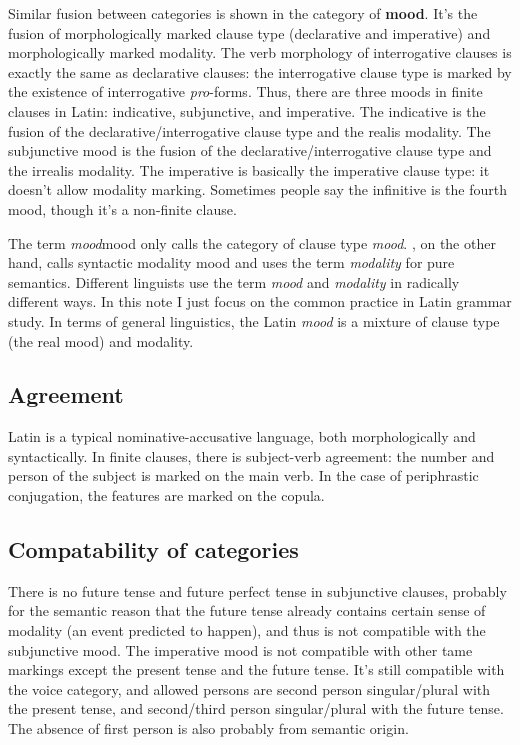 \documentclass[a4paper, oneside]{report}
\newcommand*{\concept}[1]{\textbf{#1}}
\newcommand*{\term}[1]{\emph{#1}}
\begin{document}
Similar fusion between categories is shown in the category of \concept{mood}.
It's the fusion of morphologically marked clause type 
(declarative and imperative)
and morphologically marked modality.
The verb morphology of interrogative clauses is exactly the same as declarative clauses:
the interrogative clause type is marked by the existence of interrogative \term{pro}-forms.
Thus, there are three moods in finite clauses in Latin:
\acl{indicative}, \acl{subjunctive}, and \acl{imperative}.
The \acl{indicative} is the fusion of 
the declarative/interrogative clause type and the realis modality.
The \acl{subjunctive} mood is the fusion of 
the declarative/interrogative clause type and the irrealis modality.
The \acl{imperative} is basically the imperative clause type:
it doesn't allow modality marking.
Sometimes people say the infinitive is the fourth mood,
though it's a non-finite clause.

\begin{infobox}{The term \term{mood}}{mood}
    \citet{dixon2009basic1} only calls the category of clause type \term{mood}.
    \citet{cgel}, on the other hand, 
    calls syntactic modality mood 
    and uses the term \term{modality} for pure semantics.
    Different linguists use the term \term{mood} and \term{modality} in radically different ways.
    In this note I just focus on the common practice in Latin grammar study.
    In terms of general linguistics, 
    the Latin \term{mood} is a mixture of clause type (the real mood)
    and modality.
\end{infobox}

\subsection{Agreement}\label{sec:agreement-abs}

Latin is a typical nominative-accusative language,
both morphologically and syntactically.
In finite clauses, 
there is subject-verb agreement:
the number and person of the subject is marked on the main verb.
In the case of periphrastic conjugation,
the features are marked on the copula.

\subsection{Compatability of categories}

There is no \acl{future} tense and \acl{future perfect} tense in subjunctive clauses,
probably for the semantic reason
that the future tense already contains certain sense of modality
(an event predicted to happen),
and thus is not compatible with the \acl{subjunctive} mood.
The \acl{imperative} mood is not compatible with other \ac{tame} markings
except the \acl{present} tense and the \acl{future} tense.
It's still compatible with the voice category,
and allowed persons are 
second person singular/plural with the \acl{present} tense,
and second/third person singular/plural with the \acl{future} tense.
The absence of first person is also probably from semantic origin.
\end{document}
